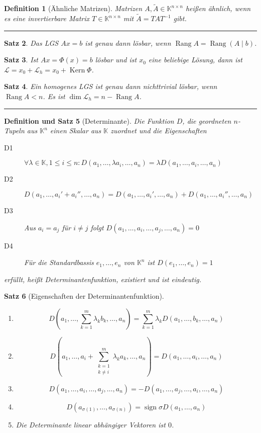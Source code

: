 \documentclass[a4paper]{article}
\newcounter{Sec}
\theoremstyle{marginbreak}
\newtheorem{definition}{Definition}[Sec]
\newtheorem{satz}[definition]{Satz}
\newtheorem{defsatz}[definition]{Definition und Satz}
\DeclareMathOperator{\Kern}{Kern}
\DeclareMathOperator{\Rang}{Rang}
\DeclareMathOperator{\sign}{sign}
\newcommand{\sep}{%
	\rule{\textwidth}{0.3pt}%
	\stepcounter{Sec}%
	}
\begin{document}
	\begin{definition}[Ähnliche Matrizen]
		Matrizen $A, \tilde{A} \in \mathbb{K}^{n\times n}$ heißen ähnlich, wenn es eine
		invertierbare Matrix $T\in \mathbb{K}^{n\times n}$ mit $\tilde{A} = TAT^{-1}$ gibt.
	\end{definition}
	\sep
	\begin{satz}
		Das LGS $Ax = b$ ist genau dann lösbar, wenn $\Rang A = \Rang(A \mid b)$.
	\end{satz}
	\begin{satz}
		Ist $Ax = \Phi(x) = b$ lösbar und ist $x_0$ eine beliebige Lösung, dann
		ist $\mathcal{L} = x_0 + \mathcal{L}_h = x_0 + \Kern\Phi$.
	\end{satz}
	\begin{satz}
		Ein homogenes LGS ist genau dann nichttrivial lösbar, wenn $\Rang A < n$.
		Es ist $\dim\mathcal{L}_h = n - \Rang A$.
	\end{satz}
	\sep
	\begin{defsatz}[Determinante]
		Die Funktion $D$, die geordneten $n$-Tupeln aus $\mathbb{K}^n$ einen Skalar aus
		$\mathbb{K}$ zuordnet und die Eigenschaften
		\begin{description}
			\item[D1] $\forall\lambda\in\mathbb{K},1\leq i\leq n: D(a_1,\ldots,\lambda a_i,\ldots,a_n) = \lambda D(a_1,\ldots,a_i,\ldots,a_n)$
			\item[D2] $D(a_1,\ldots,a_i'+a_i'',\ldots,a_n) = D(a_1,\ldots,a_i',\ldots,a_n) + D(a_1,\ldots,a_i'',\ldots,a_n)$
			\item[D3] Aus $a_i = a_j$ für $i \neq j$ folgt $D(a_1,\ldots,a_i,\ldots,a_j,\ldots,a_n) = 0$
			\item[D4] Für die Standardbassis $e_1,\ldots,e_n$ von $\mathbb{K}^n$ ist $D(e_1,\ldots,e_n) = 1$
		\end{description}
		erfüllt, heißt Determinantenfunktion, existiert und ist eindeutig.
	\end{defsatz}
	\begin{satz}[Eigenschaften der Determinantenfunktion]
		\begin{enumerate}[label=(\alph*)]
			\item
				\[ D(a_1,\ldots,\sum_{k=1}^m\lambda_kb_k,\ldots,a_n)=\sum_{k=1}^m\lambda_kD(a_1,\ldots,b_k,\ldots,a_n) \]
			\item
				\[ D(a_1,\ldots,a_i+\sum_{\substack{k=1\\k\neq i}}^m\lambda_ka_k,\ldots,a_n) = D(a_1,\ldots,a_i,\ldots,a_n) \]
			\item
				\[ D(a_1,\ldots,a_i,\ldots,a_j,\ldots,a_n) = -D(a_1,\ldots,a_j,\ldots,a_i,\ldots,a_n) \]
			\item
				\[ D(a_{\sigma(1)},\ldots,a_{\sigma(n)}) = \sign\sigma D(a_1,\ldots,a_n) \]
			\item Die Determinante linear abhängiger Vektoren ist $0$.
		\end{enumerate}
	\end{satz}
\end{document}
